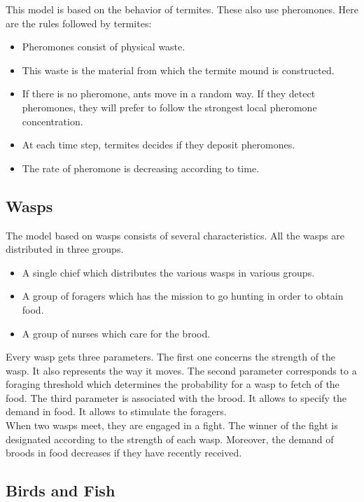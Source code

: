 This model is based on the behavior of termites. These also use pheromones. Here are the rules followed by termites:

\begin{itemize}
\item Pheromones consist of physical waste.
\item This waste is the material from which the termite mound is constructed.
\item If there is no pheromone, ants move in a random way. If they detect pheromones, they will prefer to follow the strongest local pheromone concentration.
\item At each time step, termites decides if they deposit pheromones.
\item The rate of pheromone is decreasing according to time.
\end{itemize} 

\subsection{Wasps}

The model based on wasps consists of several characteristics.
All the wasps are distributed in three groups.
\begin{itemize}
\item A single chief which distributes the various wasps in various groups.
\item A group of foragers which has the mission to go hunting in order to obtain food.
\item A group of nurses which care for the brood.
\end{itemize}

Every wasp gets three parameters. The first one concerns the strength of the wasp. It also represents the way it moves. The second parameter corresponds to a foraging threshold which determines the probability for a wasp to fetch of the food. The third parameter is associated with the brood. It allows to specify the demand in food. It allows to stimulate the foragers.\\
When two wasps meet, they are engaged in a fight.
The winner of the fight is designated according to the strength of each wasp. Moreover, the demand of broods in food decreases if they have recently received.

\subsection{Birds and Fish}

